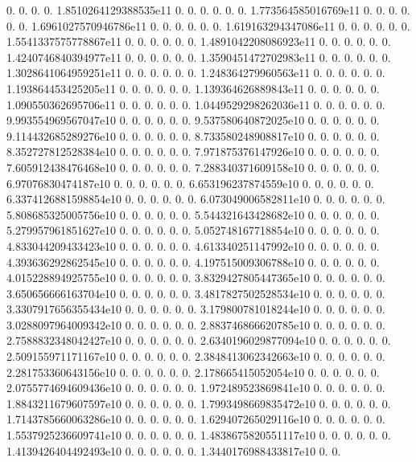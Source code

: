 0. 0. 0. 0. 1.\+8510264129388535e11 0. 0. 0. 0. 0. 0. 1.\+773564585016769e11 0. 0. 0. 0. 0. 0. 1.\+6961027570946786e11 0. 0. 0. 0. 0. 0. 1.\+619163294347086e11 0. 0. 0. 0. 0. 0. 1.\+5541337575778867e11 0. 0. 0. 0. 0. 0. 1.\+4891042208086923e11 0. 0. 0. 0. 0. 0. 1.\+4240746840394977e11 0. 0. 0. 0. 0. 0. 1.\+3590451472702983e11 0. 0. 0. 0. 0. 0. 1.\+3028641064959251e11 0. 0. 0. 0. 0. 0. 1.\+248364279960563e11 0. 0. 0. 0. 0. 0. 1.\+193864453425205e11 0. 0. 0. 0. 0. 0. 1.\+139364626889843e11 0. 0. 0. 0. 0. 0. 1.\+090550362695706e11 0. 0. 0. 0. 0. 0. 1.\+0449529298262036e11 0. 0. 0. 0. 0. 0. 9.\+993554969567047e10 0. 0. 0. 0. 0. 0. 9.\+537580640872025e10 0. 0. 0. 0. 0. 0. 9.\+114432685289276e10 0. 0. 0. 0. 0. 0. 8.\+733580248908817e10 0. 0. 0. 0. 0. 0. 8.\+352727812528384e10 0. 0. 0. 0. 0. 0. 7.\+971875376147926e10 0. 0. 0. 0. 0. 0. 7.\+605912438476468e10 0. 0. 0. 0. 0. 0. 7.\+288340371609158e10 0. 0. 0. 0. 0. 0. 6.\+97076830474187e10 0. 0. 0. 0. 0. 0. 6.\+653196237874559e10 0. 0. 0. 0. 0. 0. 6.\+3374126881598854e10 0. 0. 0. 0. 0. 0. 6.\+073049006582811e10 0. 0. 0. 0. 0. 0. 5.\+808685325005756e10 0. 0. 0. 0. 0. 0. 5.\+544321643428682e10 0. 0. 0. 0. 0. 0. 5.\+279957961851627e10 0. 0. 0. 0. 0. 0. 5.\+052748167718854e10 0. 0. 0. 0. 0. 0. 4.\+833044209433423e10 0. 0. 0. 0. 0. 0. 4.\+613340251147992e10 0. 0. 0. 0. 0. 0. 4.\+393636292862545e10 0. 0. 0. 0. 0. 0. 4.\+197515009306788e10 0. 0. 0. 0. 0. 0. 4.\+015228894925755e10 0. 0. 0. 0. 0. 0. 3.\+8329427805447365e10 0. 0. 0. 0. 0. 0. 3.\+650656666163704e10 0. 0. 0. 0. 0. 0. 3.\+4817827502528534e10 0. 0. 0. 0. 0. 0. 3.\+3307917656355434e10 0. 0. 0. 0. 0. 0. 3.\+179800781018244e10 0. 0. 0. 0. 0. 0. 3.\+0288097964009342e10 0. 0. 0. 0. 0. 0. 2.\+883746866620785e10 0. 0. 0. 0. 0. 0. 2.\+7588832348042427e10 0. 0. 0. 0. 0. 0. 2.\+6340196029877094e10 0. 0. 0. 0. 0. 0. 2.\+509155971171167e10 0. 0. 0. 0. 0. 0. 2.\+3848413062342663e10 0. 0. 0. 0. 0. 0. 2.\+281753360643156e10 0. 0. 0. 0. 0. 0. 2.\+178665415052054e10 0. 0. 0. 0. 0. 0. 2.\+0755774694609436e10 0. 0. 0. 0. 0. 0. 1.\+972489523869841e10 0. 0. 0. 0. 0. 0. 1.\+8843211679607597e10 0. 0. 0. 0. 0. 0. 1.\+7993498669835472e10 0. 0. 0. 0. 0. 0. 1.\+7143785660063286e10 0. 0. 0. 0. 0. 0. 1.\+629407265029116e10 0. 0. 0. 0. 0. 0. 1.\+5537925236609741e10 0. 0. 0. 0. 0. 0. 1.\+4838675820551117e10 0. 0. 0. 0. 0. 0. 1.\+4139426404492493e10 0. 0. 0. 0. 0. 0. 1.\+3440176988433817e10 0. 0. 